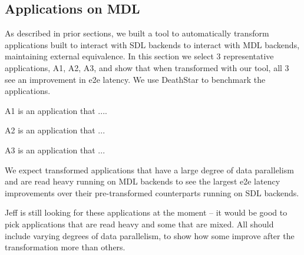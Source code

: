 \subsection{Applications on MDL}
\label{sec:apps}

As described in prior sections, we built a tool to automatically transform applications built to interact with SDL backends to interact with MDL backends, maintaining external equivalence. In this section we select 3 representative applications, A1, A2, A3, and show that when transformed with our tool, all 3 see an improvement in e2e latency. We use DeathStar to benchmark the applications.

A1 is an application that ....

A2 is an application that ...

A3 is an application that ...

We expect transformed applications that have a large degree of data parallelism and are read heavy running on MDL backends to see the largest e2e latency improvements over their pre-transformed counterparts running on SDL backends.

Jeff is still looking for these applications at the moment -- it would be good to pick applications that are read heavy and some that are mixed. All should include varying degrees of data parallelism, to show how some improve after the transformation more than others.